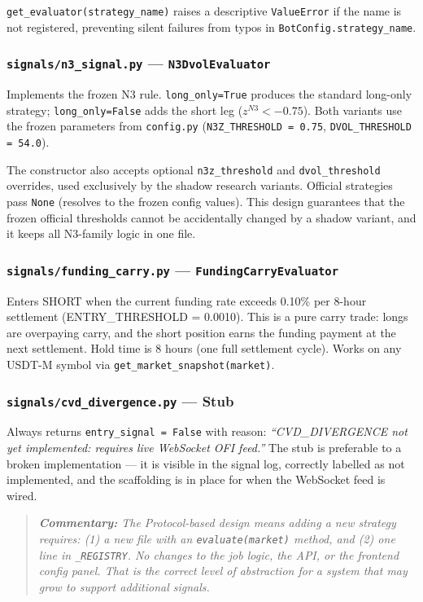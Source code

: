\documentclass[11pt,a4paper]{article}
\newcommand{\code}[1]{\texttt{#1}}
\newcommand{\comment}[1]{%
  \begin{quote}
    \small\itshape\textbf{Commentary:} #1
  \end{quote}
}
\begin{document}
\code{get\_evaluator(strategy\_name)} raises a descriptive \code{ValueError} if the name is not registered, preventing silent failures from typos in \code{BotConfig.strategy\_name}.

\subsubsection*{\code{signals/n3\_signal.py} --- \code{N3DvolEvaluator}}

Implements the frozen N3 rule. \code{long\_only=True} produces the standard long-only strategy; \code{long\_only=False} adds the short leg ($z^{N3} < -0.75$). Both variants use the frozen parameters from \code{config.py} (\code{N3Z\_THRESHOLD = 0.75}, \code{DVOL\_THRESHOLD = 54.0}).

The constructor also accepts optional \code{n3z\_threshold} and \code{dvol\_threshold} overrides, used exclusively by the shadow research variants. Official strategies pass \code{None} (resolves to the frozen config values). This design guarantees that the frozen official thresholds cannot be accidentally changed by a shadow variant, and it keeps all N3-family logic in one file.

\subsubsection*{\code{signals/funding\_carry.py} --- \code{FundingCarryEvaluator}}

Enters SHORT when the current funding rate exceeds 0.10\% per 8-hour settlement (ENTRY\_THRESHOLD = 0.0010). This is a pure carry trade: longs are overpaying carry, and the short position earns the funding payment at the next settlement. Hold time is 8 hours (one full settlement cycle). Works on any USDT-M symbol via \code{get\_market\_snapshot(market)}.

\subsubsection*{\code{signals/cvd\_divergence.py} --- Stub}

Always returns \code{entry\_signal = False} with reason: \textit{``CVD\_DIVERGENCE not yet implemented: requires live WebSocket OFI feed.''} The stub is preferable to a broken implementation --- it is visible in the signal log, correctly labelled as not implemented, and the scaffolding is in place for when the WebSocket feed is wired.

\comment{The Protocol-based design means adding a new strategy requires: (1) a new file with an \code{evaluate(market)} method, and (2) one line in \code{\_REGISTRY}. No changes to the job logic, the API, or the frontend config panel. That is the correct level of abstraction for a system that may grow to support additional signals.}
\end{document}
